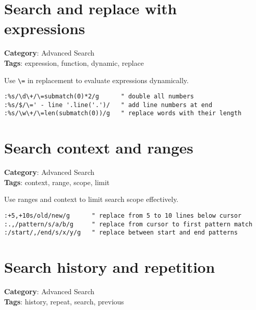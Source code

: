 \section{Search and replace with expressions}

\textbf{Category}: Advanced Search\\ \textbf{Tags}: expression, function, dynamic, replace
\vspace{0.5cm}

Use {\footnotesize \Verb§\=§} in replacement to evaluate expressions dynamically.

\begin{Exa*}{}
\begin{Verbatim}[fontsize=\footnotesize, breaklines, breakanywhere]
:%s/\d\+/\=submatch(0)*2/g      " double all numbers
:%s/$/\=' - line '.line('.')/   " add line numbers at end
:%s/\w\+/\=len(submatch(0))/g   " replace words with their length
\end{Verbatim}
\end{Exa*}

\section{Search context and ranges}

\textbf{Category}: Advanced Search\\ \textbf{Tags}: context, range, scope, limit
\vspace{0.5cm}

Use ranges and context to limit search scope effectively.

\begin{Exa*}{}
\begin{Verbatim}[fontsize=\footnotesize, breaklines, breakanywhere]
:+5,+10s/old/new/g      " replace from 5 to 10 lines below cursor
:.,/pattern/s/a/b/g     " replace from cursor to first pattern match
:/start/,/end/s/x/y/g   " replace between start and end patterns
\end{Verbatim}
\end{Exa*}

\section{Search history and repetition}

\textbf{Category}: Advanced Search\\ \textbf{Tags}: history, repeat, search, previous
\vspace{0.5cm}

